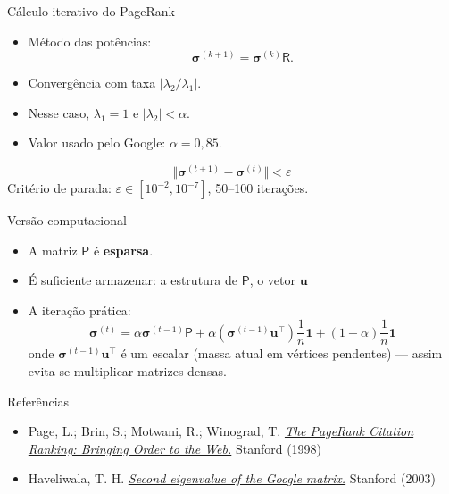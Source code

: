 \documentclass[aspectratio=169]{beamer}
\begin{document}
\begin{frame}{Cálculo iterativo do PageRank}
\begin{itemize}\itemsep=.65cm
  \item Método das potências:
  \[
    \bm{\sigma}^{(k+1)} = \bm{\sigma}^{(k)} \mathsf{R}.
  \]
  \item Convergência com taxa $|\lambda_2/\lambda_1|$.
  \item Nesse caso,  $\lambda_1=1$ e $ |\lambda_2| < \alpha$.
  \item Valor usado pelo Google: $\alpha = 0{,}85$.
\end{itemize}
\[
\Vert \bm{\sigma}^{(t+1)} - \bm{\sigma}^{(t)} \Vert < \varepsilon
\]
Critério de parada: $\varepsilon\in[10^{-2},10^{-7}]$, 50–100 iterações.
\end{frame}

\begin{frame}{Versão computacional}
  \begin{itemize}\itemsep=.5cm
  \item A matriz $\mathsf{P}$ é \textbf{esparsa}.
    
  \item É suficiente armazenar:  a estrutura de $\mathsf{P}$, o vetor $\bm{u}$
    
  \item A iteração prática:
    \[
      \bm{\sigma}^{(t)} = \alpha \bm{\sigma}^{(t-1)}\mathsf{P} + \alpha
      (\bm{\sigma}^{(t-1)}\mathbf{u}^\intercal)\frac{1}{n}\mathbf{1} +
      (1-\alpha)\frac{1}{n}\mathbf{1}
    \]onde \(\bm{\sigma}^{(t-1)}\mathbf{u}^\intercal\) é um escalar
    (massa atual em vértices pendentes) — assim evita-se multiplicar
    matrizes densas.
\end{itemize}
\end{frame}

\begin{frame}{Referências}
\small
\begin{itemize}
  \item Page, L.; Brin, S.; Motwani, R.; Winograd, T. \href{http://ilpubs.stanford.edu:8090/422/1/1999-66.pdf}{\textit{The PageRank Citation Ranking: Bringing Order to the Web.}} Stanford  (1998)
  \item Haveliwala, T. H. \href{https://nlp.stanford.edu/pubs/secondeigenvalue.pdf}{\textit{Second eigenvalue of the Google matrix.}} Stanford (2003)
\end{itemize}
\end{frame}
\end{document}
